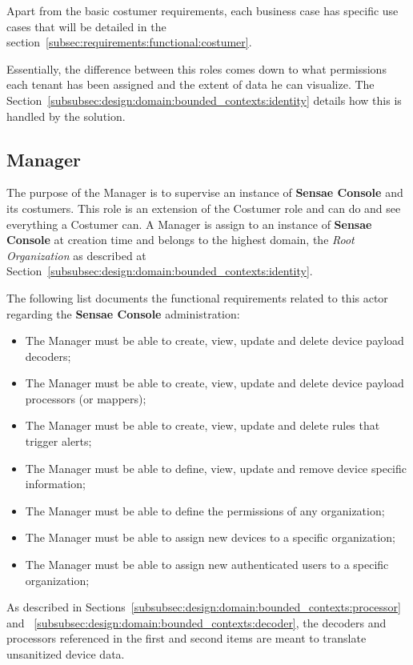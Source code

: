 Apart from the basic costumer requirements, each business case has specific use cases that will be detailed in the section~\ref{subsec:requirements:functional:costumer}.

Essentially, the difference between this roles comes down to what permissions each tenant has been assigned and the extent of data he can visualize. The Section~\ref{subsubsec:design:domain:bounded_contexts:identity} details how this is handled by the solution.

\subsection{Manager}
\label{subsec:requirements:functional:manager}

The purpose of the Manager is to supervise an instance of \textbf{Sensae Console} and its costumers. This role is an extension of the Costumer role and can do and see everything a Costumer can. A Manager is assign to an instance of \textbf{Sensae Console} at creation time and belongs to the highest domain, the \textit{Root Organization} as described at Section~\ref{subsubsec:design:domain:bounded_contexts:identity}.

The following list documents the functional requirements related to this actor regarding the \textbf{Sensae Console} administration:

\begin{itemize}
    \item The Manager must be able to create, view, update and delete device payload decoders;
    \item The Manager must be able to create, view, update and delete device payload processors (or mappers);
    \item The Manager must be able to create, view, update and delete rules that trigger alerts;
    \item The Manager must be able to define, view, update and remove device specific information;
    \item The Manager must be able to define the permissions of any organization;
    \item The Manager must be able to assign new devices to a specific organization;
    \item The Manager must be able to assign new authenticated users to a specific organization;
\end{itemize}

As described in Sections~\ref{subsubsec:design:domain:bounded_contexts:processor} and ~\ref{subsubsec:design:domain:bounded_contexts:decoder}, the decoders and processors referenced in the first and second items are meant to translate unsanitized device data.

